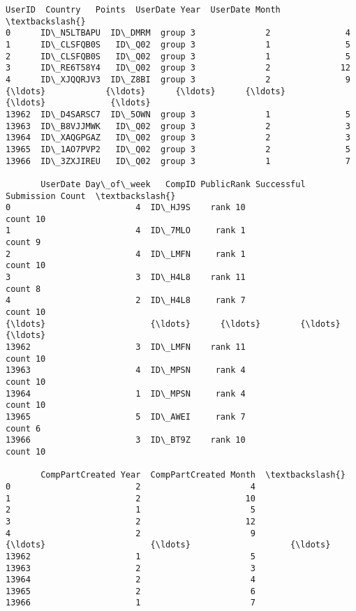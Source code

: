 \documentclass{report}
\makeatletter
\newcommand{\boxspacing}{\kern\kvtcb@left@rule\kern\kvtcb@boxsep}
\newcommand{\prompt}[4]{
        \ttfamily\llap{{\color{#2}[#3]:\hspace{3pt}#4}}\vspace{-\baselineskip}
    }
\makeatother
\begin{document}
            \begin{tcolorbox}[breakable, size=fbox, boxrule=.5pt, pad at break*=1mm, opacityfill=0]
\prompt{Out}{outcolor}{22}{\boxspacing}
\begin{Verbatim}[commandchars=\\\{\}]
            UserID  Country   Points  UserDate Year  UserDate Month  \textbackslash{}
0      ID\_N5LTBAPU  ID\_DMRM  group 3              2               4
1      ID\_CLSFQB0S   ID\_Q02  group 3              1               5
2      ID\_CLSFQB0S   ID\_Q02  group 3              1               5
3      ID\_RE6T58Y4   ID\_Q02  group 3              2              12
4      ID\_XJQQRJV3  ID\_Z8BI  group 3              2               9
{\ldots}            {\ldots}      {\ldots}      {\ldots}            {\ldots}             {\ldots}
13962  ID\_D4SARSC7  ID\_5OWN  group 3              1               5
13963  ID\_B8VJJMWK   ID\_Q02  group 3              2               3
13964  ID\_XAQGPGAZ   ID\_Q02  group 3              2               3
13965  ID\_1AO7PVP2   ID\_Q02  group 3              2               5
13966  ID\_3ZXJIREU   ID\_Q02  group 3              1               7

       UserDate Day\_of\_week   CompID PublicRank Successful Submission Count  \textbackslash{}
0                         4  ID\_HJ9S    rank 10                    count 10
1                         4  ID\_7MLO     rank 1                     count 9
2                         4  ID\_LMFN     rank 1                    count 10
3                         3  ID\_H4L8    rank 11                     count 8
4                         2  ID\_H4L8     rank 7                    count 10
{\ldots}                     {\ldots}      {\ldots}        {\ldots}                         {\ldots}
13962                     3  ID\_LMFN    rank 11                    count 10
13963                     4  ID\_MPSN     rank 4                    count 10
13964                     1  ID\_MPSN     rank 4                    count 10
13965                     5  ID\_AWEI     rank 7                     count 6
13966                     3  ID\_BT9Z    rank 10                    count 10

       CompPartCreated Year  CompPartCreated Month  \textbackslash{}
0                         2                      4
1                         2                     10
2                         1                      5
3                         2                     12
4                         2                      9
{\ldots}                     {\ldots}                    {\ldots}
13962                     1                      5
13963                     2                      3
13964                     2                      4
13965                     2                      6
13966                     1                      7


\end{Verbatim}
\end{tcolorbox}
\end{document}
